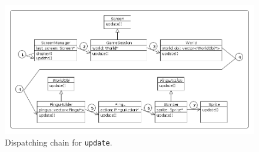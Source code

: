 \documentclass{vgtc}                          %
\newcommand{\code}[1] {{\small{\texttt{#1}}}}
\begin{document}
\begin{figure}
\centering
\includegraphics[width=\columnwidth]{hierarchy}
\caption{Dispatching chain for \code{update}.
\label{fig.hier}
}
\end{figure}
\end{document}
